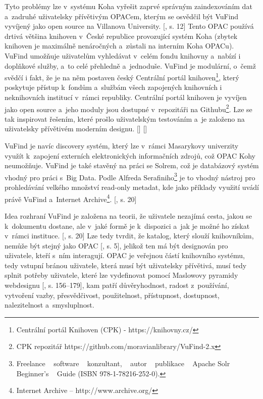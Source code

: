 \documentclass[
	11pt, oneside, printed, final, palatino
	microtype,
	table,   %
	lof,     %
	lot     %
]{fithesis3}
\newcommand{\citepages}[2]{[\cite{#2}, s. #1]}
\newcommand{\citesource}[1]{[\cite{#1}]}
\begin{document}
{Tyto problémy lze v~systému Koha vyřešit zaprvé správným zaindexováním dat a~zadruhé uživatelsky přívětivým OPACem, kterým se osvědčil být VuFind vyvíjený jako open source na Villanova University. \citepages{12}{Coufalova2009} Tento OPAC používá drtivá většina knihoven v~České republice provozující systém Koha (zbytek knihoven je maximálně nenáročných a~zůstali na interním Koha OPACu). VuFind umožňuje uživatelům vyhledávat v~celém fondu knihovny a~nabízí i doplňkové služby, a~to celé přehledně a~jednoduše. VuFind je modulární, o~čemž svědčí i fakt, že je na něm postaven český Centrální portál knihoven\footnote{Centrální portál Knihoven (CPK) - https://knihovny.cz/}, který poskytuje přístup k~fondům a~službám všech zapojených knihovních i neknihovních institucí v~rámci republiky. Centrální portál knihoven je vyvíjen jako open source a~jeho moduly jsou dostupné v~repozitáři na Githubu\footnote{CPK repozitář https://github.com/moravianlibrary/VuFind-2.x
}. Lze se tak inspirovat řešením, které prošlo uživatelským testováním a~je založeno na uživatelsky přívětivém moderním designu. \citesource{aktivity_2016}  \citesource{smlouva_o_dilo_2015}

VuFind je navíc discovery systém, který lze v~rámci Masarykovy univerzity využít k~zapojení externích elektronických informačních zdrojů, což OPAC Kohy neumožňuje. VuFind je také stavěný na práci se Solrem, což je databázový systém vhodný pro práci s~Big Data. Podle Alfreda Serafiniho\footnote{Freelance ~ software ~ konzultant, ~ autor ~ publikace ~ Apache Solr ~ Beginner's ~ Guide (ISBN 978-1-78216-252-0).} je to vhodný nástroj pro prohledávání velkého množství read-only metadat, kde jako příklady využití uvádí právě VuFind a~Internet Archive\footnote{Internet Archive – http://www.archive.org/}. \citepages{20}{68071520130101}

Idea rozhraní VuFind je založena na teorii, že uživatele nezajímá cesta, jakou se k~dokumentu dostane, ale v~jaké formě je k~dispozici a~jak je možné ho získat v~rámci instituce. \citepages{20}{Coufalova2009} Lze tedy tvrdit, že katalog, který slouží knihovníkům, nemůže být stejný jako OPAC \citepages{5}{Schmidt2012}, jelikož ten má být designován pro uživatele, kteří s~ním interagují. OPAC je veřejnou částí knihovního systému, tedy vstupní bránou uživatele, která musí být uživatelsky přívětivá, musí tedy splnit potřeby uživatele, které lze vydefinovat pomocí Maslowovy pyramidy webdesignu \citepages{156–179}{rezac_2014}, kam patří důvěryhodnost, radost z~používání, vytvoření vazby, přesvědčivost, použitelnost, přístupnost, dostupnost, nalezitelnost a~smysluplnost. 

}
\end{document}
